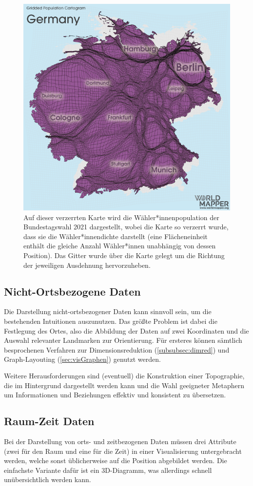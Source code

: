 				\begin{figure}
					\centering
					\includegraphics[width=0.6\linewidth]{worldmapper}
					\caption[Beispiel für eine verzerrte Karte]{Auf dieser verzerrten Karte wird die Wähler*innenpopulation der Bundestagswahl 2021 dargestellt, wobei die Karte so verzerrt wurde, dass sie die Wähler*innendichte darstellt (\dh eine Flächeneinheit enthält die gleiche Anzahl Wähler*innen unabhängig von dessen Position). Das Gitter wurde über die Karte gelegt um die Richtung der jeweiligen Ausdehnung hervorzuheben.}
					\label{fig:worldmap}
				\end{figure}

		\subsection{Nicht-Ortsbezogene Daten}
			Die Darstellung nicht-ortsbezogener Daten kann \zB sinnvoll sein, um die bestehenden Intuitionen auszunutzen. Das größte Problem ist dabei die Festlegung des Ortes, also die Abbildung der Daten auf zwei Koordinaten und die Auswahl relevanter Landmarken zur Orientierung. Für ersteres können sämtlich besprochenen Verfahren zur Dimensionsreduktion (\autoref{subsubsec:dimred}) und Graph-Layouting (\autoref{sec:visGraphen}) genutzt werden.

			Weitere Herausforderungen sind (eventuell) die Konstruktion einer Topographie, die im Hintergrund dargestellt werden kann und die Wahl geeigneter Metaphern um Informationen und Beziehungen effektiv und konsistent zu übersetzen.

		\subsection{Raum-Zeit Daten}
			Bei der Darstellung von orts- und zeitbezogenen Daten müssen drei Attribute (zwei für den Raum und eine für die Zeit) in einer Visualisierung untergebracht werden, welche sonst üblicherweise auf die Position abgebildet werden. Die einfachste Variante dafür ist ein 3D-Diagramm, was allerdings schnell unübersichtlich werden kann.

